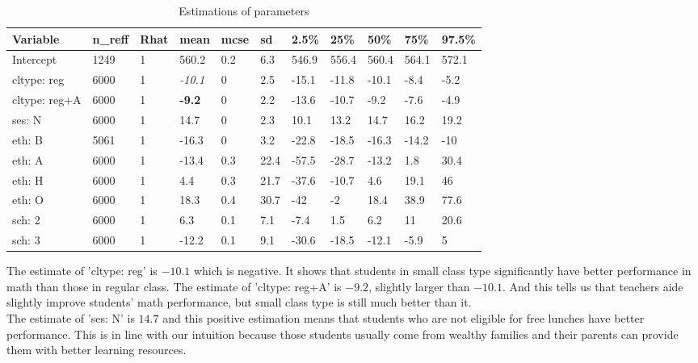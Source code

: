\documentclass{article}
\begin{document}
\begin{table}[h]
    \centering
    \caption{Estimations of parameters}
    \label{tab:estimation}
    \begin{tabular}{|l|l|l|l|l|l|l|l|l|l|l|}
    \hline
    Variable      & n\_reff & Rhat & mean           & mcse & sd   & 2.5\% & 25\%  & 50\%  & 75\%  & 97.5\% \\ \hline
    Intercept     & 1249    & 1    & 560.2          & 0.2  & 6.3  & 546.9 & 556.4 & 560.4 & 564.1 & 572.1  \\ \hline
    cltype: reg   & 6000    & 1    & \textit{-10.1} & 0    & 2.5  & -15.1 & -11.8 & -10.1 & -8.4  & -5.2   \\ \hline
    cltype: reg+A & 6000    & 1    & \textbf{-9.2}  & 0    & 2.2  & -13.6 & -10.7 & -9.2  & -7.6  & -4.9   \\ \hline
    ses: N        & 6000    & 1    & 14.7           & 0    & 2.3  & 10.1  & 13.2  & 14.7  & 16.2  & 19.2   \\ \hline
    eth: B        & 5061    & 1    & -16.3          & 0    & 3.2  & -22.8 & -18.5 & -16.3 & -14.2 & -10    \\ \hline
    eth: A        & 6000    & 1    & -13.4          & 0.3  & 22.4 & -57.5 & -28.7 & -13.2 & 1.8   & 30.4   \\ \hline
    eth: H        & 6000    & 1    & 4.4            & 0.3  & 21.7 & -37.6 & -10.7 & 4.6   & 19.1  & 46     \\ \hline
    eth: O        & 6000    & 1    & 18.3           & 0.4  & 30.7 & -42   & -2    & 18.4  & 38.9  & 77.6   \\ \hline
    sch: 2        & 6000    & 1    & 6.3            & 0.1  & 7.1  & -7.4  & 1.5   & 6.2   & 11    & 20.6   \\ \hline
    sch: 3        & 6000    & 1    & -12.2          & 0.1  & 9.1  & -30.6 & -18.5 & -12.1 & -5.9  & 5      \\ \hline
    \end{tabular}
\end{table}

The estimate of 'cltype: reg' is $-10.1$ which is negative. It shows that students in small class type significantly have better 
performance in math than those in regular class. The estimate of 'cltype: reg+A' is $-9.2$, slightly larger than $-10.1$. 
And this tells us that teachers aide slightly improve students’ math performance, but small class type is still much better than it.\\

The estimate of 'ses: N' is $14.7$ and this positive estimation means that students who are not eligible for free lunches have
better performance. This is in line with our intuition because those students usually come from wealthy families and their 
parents can provide them with better learning resources.\\
\end{document}
